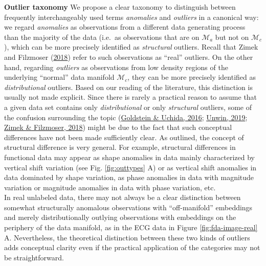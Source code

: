 \documentclass[
  10pt]{article}
\newcommand{\co}{c}
\newcommand{\an}{a}
\newcommand{\Min}{\mathcal{M}_{\co}}
\newcommand{\Man}{\mathcal{M}_{\an}}
\begin{document}
\textbf{Outlier taxonomy} We propose a clear taxonomy to distinguish between frequently interchangeably used terms \emph{anomalies} and \emph{outliers} in a canonical way: we regard \emph{anomalies} as observations from a different data generating process than the majority of the data (i.e.~as observations that are on \(\Man\) but not on \(\Min\)), which can be more precisely identified as \emph{structural} outliers. Recall that Zimek and Filzmoser (\protect\hyperlink{ref-zimek2018there}{2018}) refer to such observations as ``real'' outliers. On the other hand, regarding \emph{outliers} as observations from low density regions of the underlying ``normal'' data manifold \(\Min\), they can be more precisely identified as \emph{distributional} outliers.
Based on our reading of the literature, this distinction is usually not made explicit. Since there is rarely a practical reason to assume that a given data set contains only \textit{distributional} or only \textit{structural} outliers, some of the confusion surrounding the topic (\protect\hyperlink{ref-goldstein2016comparative}{Goldstein \& Uchida, 2016}; \protect\hyperlink{ref-unwin2019multivariate}{Unwin, 2019}; \protect\hyperlink{ref-zimek2018there}{Zimek \& Filzmoser, 2018}) might be due to the fact that such conceptual differences have not been made sufficiently clear.
As outlined, the concept of structural difference is very general. For example, structural differences in functional data may appear as shape anomalies in data mainly characterized by vertical shift variation (see Fig. \ref{fig:outtypes} A) or as vertical shift anomalies in data dominated by shape variation, as phase anomalies in data with magnitude variation or magnitude anomalies in data with phase variation, etc.\\
In real unlabeled data, there may not always be a clear distinction between somewhat structurally anomalous observations with ``off-manifold'' embeddings and merely distributionally outlying observations with embeddings on the periphery of the data manifold, as in the ECG data in Figure \ref{fig:fda-image-real} A. Nevertheless, the theoretical distinction between these two kinds of outliers adds conceptual clarity even if the practical application of the categories may not be straightforward.\\
\end{document}
